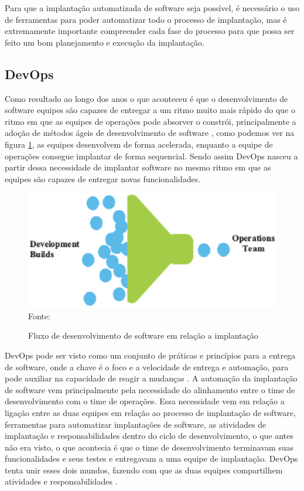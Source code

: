Para que a implantação automatizada de software seja possível, é necessário o uso
de ferramentas para poder automatizar todo o processo de implantação,
mas é extremamente importante compreender cada fase do processo para que possa ser
feito um bom planejamento e execução da implantação.

\subsection{DevOps}
\label{subsec:DevOps}
Como resultado ao longo dos anos o que aconteceu é que o desenvolvimento de software
equipes são capazes de entregar a um ritmo muito mais rápido do que o ritmo em
que as equipes de operações pode absorver o constrói, principalmente a adoção
de métodos ágeis de desenvolvimento de software \cite{7173368}, como podemos
ver na figura \ref{fig:DevOps}, as equipes desenvolvem de forma acelerada, enquanto
a equipe de operações consegue implantar de forma sequencial. Sendo assim DevOps
nasceu a partir dessa necessidade de implantar software no mesmo ritmo em que
as equipes são capazes de entregar novas funcionalidades.

\begin{figure}[h]
  \centering
  \caption{Fluxo de desenvolvimento de software em relação a implantação}
  \includegraphics[width=1.0\textwidth]
      {figuras/DevOps.eps}
    Fonte: \cite{7173368}
\label{fig:DevOps}
\end{figure}

DevOps pode ser visto como um conjunto de práticas e princípios para a entrega de software, onde a
chave é o foco e a velocidade de entrega e automação, para pode auxiliar na capacidade
de reagir a mudanças \cite{7173368}. A automação da implantação de software vem
principalmente pela necessidade do alinhamento entre o time de desenvolvimento
com o time de operações. Essa necessidade vem em relação a ligação entre as duas
equipes em relação ao processo de implantação de software, ferramentas para
automatizar implantações de software, as atividades de implantação e responsabilidades
dentro do ciclo de desenvolvimento, o que antes não era visto, o que acontecia é
que o time de desenvolvimento terminavam suas funcionalidades e seus testes e
entregavam a uma equipe de implantação. DevOps tenta unir esses dois mundos,
fazendo com que as duas equipes compartilhem atividades e responsabilidades \cite{6265084}.

